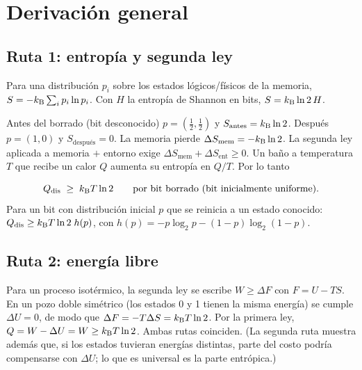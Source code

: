 \documentclass[11pt,a4paper]{article}
\begin{document}
\section{Derivación general}
\subsection{Ruta 1: entropía y segunda ley}
\begin{definicion}
Para una distribución $p_i$ sobre los estados lógicos/físicos de la memoria,
$S=-k_{\mathrm B}\sum_i p_i\ln p_i$. Con $H$ la entropía de Shannon en bits, $S=k_{\mathrm B}\ln 2\,H$.
\end{definicion}
Antes del borrado (bit desconocido) $p=(\tfrac12,\tfrac12)$ y $S_{\text{antes}}=k_{\mathrm B}\ln2$. Después
$p=(1,0)$ y $S_{\text{después}}=0$. La memoria pierde $\Delta S_{\text{mem}}=-k_{\mathrm B}\ln2$. La segunda ley
aplicada a memoria $+$ entorno exige $\Delta S_{\text{mem}}+\Delta S_{\text{ent}}\ge0$. Un baño a
temperatura $T$ que recibe un calor $Q$ aumenta su entropía en $Q/T$. Por lo tanto
\begin{resultado}
\begin{equation}
Q_{\text{dis}}\;\ge\;k_{\mathrm B} T\ln 2\qquad\text{por bit borrado (bit inicialmente uniforme).}
\end{equation}
Para un bit con distribución inicial $p$ que se reinicia a un estado conocido:
$Q_{\text{dis}}\ge k_{\mathrm B} T\ln 2\; h(p)$, con $h(p)=-p\log_2p-(1-p)\log_2(1-p)$.
\end{resultado}

\subsection{Ruta 2: energía libre}
Para un proceso isotérmico, la segunda ley se escribe $W\ge\Delta F$ con $F=U-TS$. En un pozo doble
simétrico (los estados 0 y 1 tienen la misma energía) se cumple $\Delta U=0$, de modo que
$\Delta F=-T\Delta S=k_{\mathrm B} T\ln 2$. Por la primera ley, $Q = W-\Delta U = W\ge k_{\mathrm B} T\ln2$. Ambas rutas
coinciden. (La segunda ruta muestra además que, si los estados tuvieran energías distintas, parte del
costo podría compensarse con $\Delta U$; lo que es universal es la parte entrópica.)
\end{document}
